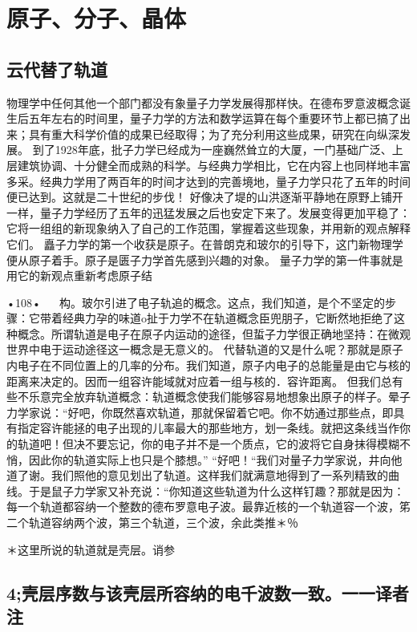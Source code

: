 \chapter{原子、分子、晶体}

\section{云代替了轨道}

物理学中任何其他一个部门都没有象量子力学发展得那样快。在德布罗意波概念诞生后五年左右的时间里，量子力学的方法和数学运算在每个重要环节上都已搞了出来；具有重大科学价值的成果已经取得；为了充分利用这些成果，研究在向纵深发展。
到了1928年底，批子力学已经成为一座巍然耸立的大厦，一门基础广泛、上层建筑协调、十分健全而成熟的科学。与经典力学相比，它在内容上也同样地丰富多采。经典力学用了两百年的时间才达到的完善境地，量子力学只花了五年的时间便已达到。这就是二十世纪的步伐！
好像决了堤的山洪逐渐平静地在原野上铺开一样，量子力学经历了五年的迅猛发展之后也安定下来了。发展变得更加平稳了：它将一组组的新现象纳入了自己的工作范围，掌握着这些现象，并用新的观点解释它们。
矗子力学的第一个收获是原子。在普朗克和玻尔的引导下，这门新物理学便从原子着手。原子是匮子力学首先感到兴趣的对象。
量子力学的第一件事就是用它的新观点重新考虑原子结

•108•
  
构。玻尔引进了电子轨追的概念。这点，我们知道，是个不坚定的步骤：它带着经典力孕的味道o扯于力学不在轨道概念臣兜朋子，它断然地拒绝了这种概念。所谓轨道是电子在原子内运动的途径，但蜇子力学很正确地坚持：在微观世界中电于运动途径这一概念是无意义的。
代替轨道的又是什么呢？那就是原子内电子在不同位置上的几率的分布。我们知道，原子内电子的总能量是由它与核的距离来决定的。因而一组容许能域就对应着一组与核的．容许距离。
但我们总有些不乐意完全放弃轨道概念：轨道概念使我们能够容易地想象出原子的样子。晕子力学家说：“好吧，你既然喜欢轨道，那就保留着它吧。你不妨通过那些点，即具有指定容许能拯的电子出现的儿率最大的那些地方，划一条线。就把这条线当作你的轨道吧！但决不要忘记，你的电子并不是一个质点，它的波将它自身抹得模糊不悄，因此你的轨道实际上也只是个膝想。”
“好吧！“我们对量子力学家说，井向他道了谢。我们照他的意见划出了轨道。这样我们就满意地得到了一系列精致的曲线。于是鼠子力学家又补充说：“你知道这些轨道为什么这样钉趣？那就是因为：每一个轨道都容纳一个整数的德布罗意电子波。最靠近核的一个轨道容一个波，笫二个轨道容纳两个波，第三个轨道，三个波，余此类推＊％

＊这里所说的轨道就是壳层。诮参\section{4;壳层序数与该壳层所容纳的电千波数一致。一一译者注}

